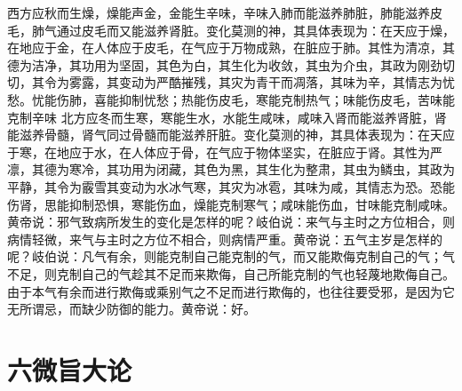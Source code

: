 \documentclass[a4paper,12pt,UTF8,twoside]{ctexbook}
\begin{document}
西方应秋而生燥，燥能声金，金能生辛味，辛味入肺而能滋养肺脏，肺能滋养皮毛，肺气通过皮毛而又能滋养肾脏。变化莫测的神，其具体表现为：在天应于燥，在地应于金，在人体应于皮毛，在气应于万物成熟，在脏应于肺。其性为清凉，其德为洁净，其功用为坚固，其色为白，其生化为收敛，其虫为介虫，其政为刚劲切切，其令为雾露，其变动为严酷摧残，其灾为青干而凋落，其味为辛，其情志为忧愁。忧能伤肺，喜能抑制忧愁；热能伤皮毛，寒能克制热气；味能伤皮毛，苦味能克制辛味
北方应冬而生寒，寒能生水，水能生咸味，咸味入肾而能滋养肾脏，肾能滋养骨髓，肾气同过骨髓而能滋养肝脏。变化莫测的神，其具体表现为：在天应于寒，在地应于水，在人体应于骨，在气应于物体坚实，在脏应于肾。其性为严凛，其德为寒冷，其功用为闭藏，其色为黑，其生化为整肃，其虫为鳞虫，其政为平静，其令为霰雪其变动为水冰气寒，其灾为冰雹，其味为咸，其情志为恐。恐能伤肾，思能抑制恐惧，寒能伤血，燥能克制寒气；咸味能伤血，甘味能克制咸味。
黄帝说：邪气致病所发生的变化是怎样的呢？岐伯说：来气与主时之方位相合，则病情轻微，来气与主时之方位不相合，则病情严重。黄帝说：五气主岁是怎样的呢？岐伯说：凡气有余，则能克制自己能克制的气，而又能欺侮克制自己的气；气不足，则克制自己的气趁其不足而来欺侮，自己所能克制的气也轻蔑地欺侮自己。由于本气有余而进行欺侮或乘别气之不足而进行欺侮的，也往往要受邪，是因为它无所谓忌，而缺少防御的能力。黄帝说：好。

\chapter{六微旨大论}
\end{document}
